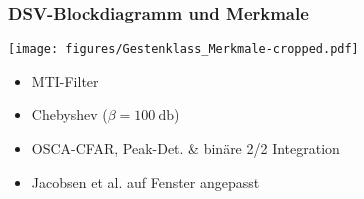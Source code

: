 \documentclass[16pt]{beamer}
\begin{document}
\begin{frame}
	\frametitle{DSV-Blockdiagramm und Merkmale}
	\texttt{[image: figures/Gestenklass\_Merkmale-cropped.pdf]}
	\begin{itemize}
		\item{ MTI-Filter}
		\item{ Chebyshev ($\beta = \SI{100}{\decibel}$)}
		\item{ OSCA-CFAR, Peak-Det. \& binäre 2/2 Integration}
		\item{ Jacobsen et al. \cite{Jacobsen2007} auf Fenster angepasst}
	\end{itemize}
\end{frame} 
\end{document}
